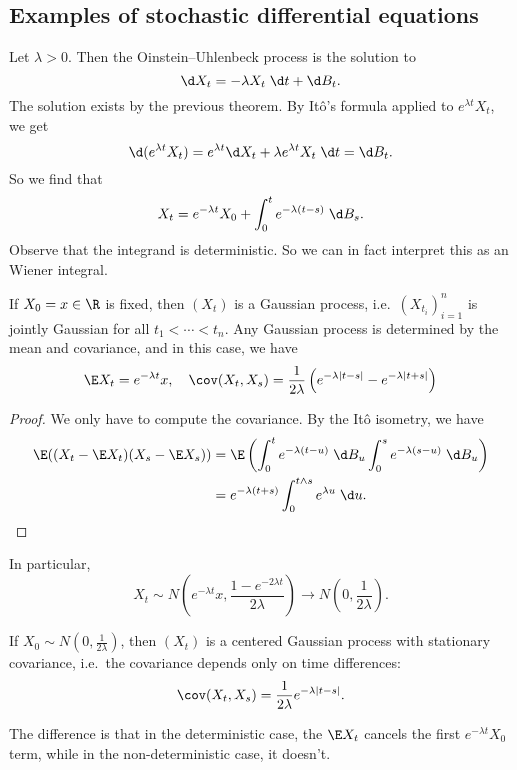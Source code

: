 \documentclass[a4paper]{article}
\begin{document}
\subsection{Examples of stochastic differential equations}
\begin{eg}
  Let $\lambda > 0$. Then the Oinstein--Uhlenbeck process is the solution to
  \[
    \d X_t = - \lambda X_t \;\d t + \d B_t.
  \]
  The solution exists by the previous theorem. By It\^o's formula applied to $e^{\lambda t} X_t$, we get
  \[
    \d (e^{\lambda t} X_t) = e^{\lambda t} \d X_t + \lambda e^{\lambda t} X_t \;\d t = \d B_t.
  \]
  So we find that
  \[
    X_t = e^{-\lambda t} X_0 + \int_0^t e^{-\lambda (t - s)}\;\d B_s.
  \]
  Observe that the integrand is deterministic. So we can in fact interpret this as an Wiener integral.
\end{eg}

\begin{fact}
  If $X_0 = x \in \R$ is fixed, then $(X_t)$ is a Gaussian process, i.e.\ $(X_{t_i})_{i = 1}^n $ is jointly Gaussian for all $t_1 < \cdots < t_n$. Any Gaussian process is determined by the mean and covariance, and in this case, we have
  \[
    \E X_t = e^{-\lambda t} x,\quad \cov(X_t, X_s) = \frac{1}{2\lambda} \left(e^{-\lambda |t - s|} - e^{-\lambda |t + s|}\right)
  \]
\end{fact}

\begin{proof}
  We only have to compute the covariance. By the It\^o isometry, we have
  \begin{align*}
    \E ((X_t - \E X_t) (X_s - \E X_s)) &= \E \left(\int_0^t e^{-\lambda (t - u)}\;\d B_u \int_0^s e^{-\lambda (s - u)}\;\d B_u\right)\\
    &= e^{-\lambda (t + s)} \int_0^{t \wedge s} e^{\lambda u}\;\d u.\qedhere
  \end{align*}
\end{proof}
In particular,
\[
  X_t \sim N\left(e^{-\lambda t}x, \frac{1 - e^{-2\lambda t}}{2 \lambda}\right) \to N\left(0, \frac{1}{2\lambda}\right).
\]
\begin{fact}
  If $X_0 \sim N(0, \frac{1}{2\lambda})$, then $(X_t)$ is a centered Gaussian process with stationary covariance, i.e.\ the covariance depends only on time differences:
  \[
    \cov(X_t, X_s) = \frac{1}{2\lambda} e^{-\lambda |t - s|}.
  \]
\end{fact}
The difference is that in the deterministic case, the $\E X_t$ cancels the first $e^{-\lambda t} X_0$ term, while in the non-deterministic case, it doesn't.
\end{document}
